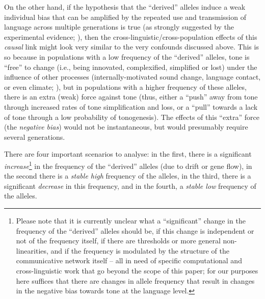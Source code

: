 \documentclass[twoside,onecolumn]{article}
\begin{document}
On the other hand, if the hypothesis that the ``derived'' alleles induce a weak individual bias that can be amplified by the repeated use and transmission of language across multiple generations \citep{dediu_ladd_2007,dediu_humbiol_2011,ladd_bioling_2008} is true (as strongly suggested by the experimental evidence; \citealp{wong_plosone_2012,wong_sciadv_2020}), then the cross-linguistic/cross-population effects of this \emph{causal} link might look very similar to the very confounds discussed above.
This is so because in populations with a low frequency of the ``derived'' alleles, tone is ``free'' to change (i.e., being innovated, complexified, simplified or lost) under the influence of other processes (internally-motivated sound change, language contact, or even climate; \citealp{yip_tone_2002,hombert_tone_1979,everett_language_2016}), but in populations with a higher frequency of these alleles, there is an extra (weak) force against tone (thus, either a ``push'' away from tone through increased rates of tone simplification and loss, or a ``pull'' towards a lack of tone through a low probability of tonogenesis).
The effects of this ``extra'' force (the \emph{negative bias}) would not be instantaneous, but would presumably require several generations.

There are four important scenarios to analyse: in the first, there is a significant \emph{increase}\footnote{Please note that it is currently unclear what a ``significant'' change in the frequency of the ``derived'' alleles should be, if this change is independent or not of the frequency itself, if there are thresholds or more general non-linearities, and if the frequency is modulated by the structure of the communicative network itself \citep{dediu_jtb_2008,dediu_jtb_2009,josserand_frontiers_2020} -- all in need of specific computational and cross-linguistic work that go beyond the scope of this paper; for our purposes here suffices that there are changes in allele frequency that result in changes in the negative bias towards tone at the language level.} in the frequency of the ``derived'' alleles (due to drift or gene flow), in the second there is a \emph{stable high} frequency of the alleles, in the third, there is a significant \emph{decrease} in this frequency, and in the fourth, a \emph{stable low} frequency of the alleles.
\end{document}
